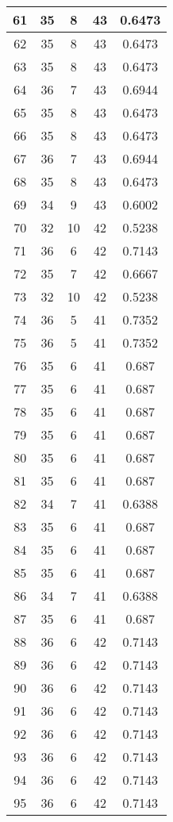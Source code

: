 \documentclass[letterpaper, 12pt]{article}
\begin{document}
\begin{longtable}{|c|c|c|c|c|}
\hline
61 & 35 & 8 & 43 & 0.6473 \\
\hline
62 & 35 & 8 & 43 & 0.6473 \\
\hline
63 & 35 & 8 & 43 & 0.6473 \\
\hline
64 & 36 & 7 & 43 & 0.6944 \\
\hline
65 & 35 & 8 & 43 & 0.6473 \\
\hline
66 & 35 & 8 & 43 & 0.6473 \\
\hline
67 & 36 & 7 & 43 & 0.6944 \\
\hline
68 & 35 & 8 & 43 & 0.6473 \\
\hline
69 & 34 & 9 & 43 & 0.6002 \\
\hline
70 & 32 & 10 & 42 & 0.5238 \\
\hline
71 & 36 & 6 & 42 & 0.7143 \\
\hline
72 & 35 & 7 & 42 & 0.6667 \\
\hline
73 & 32 & 10 & 42 & 0.5238 \\
\hline
74 & 36 & 5 & 41 & 0.7352 \\
\hline
75 & 36 & 5 & 41 & 0.7352 \\
\hline
76 & 35 & 6 & 41 & 0.687 \\
\hline
77 & 35 & 6 & 41 & 0.687 \\
\hline
78 & 35 & 6 & 41 & 0.687 \\
\hline
79 & 35 & 6 & 41 & 0.687 \\
\hline
80 & 35 & 6 & 41 & 0.687 \\
\hline
81 & 35 & 6 & 41 & 0.687 \\
\hline
82 & 34 & 7 & 41 & 0.6388 \\
\hline
83 & 35 & 6 & 41 & 0.687 \\
\hline
84 & 35 & 6 & 41 & 0.687 \\
\hline
85 & 35 & 6 & 41 & 0.687 \\
\hline
86 & 34 & 7 & 41 & 0.6388 \\
\hline
87 & 35 & 6 & 41 & 0.687 \\
\hline
88 & 36 & 6 & 42 & 0.7143 \\
\hline
89 & 36 & 6 & 42 & 0.7143 \\
\hline
90 & 36 & 6 & 42 & 0.7143 \\
\hline
91 & 36 & 6 & 42 & 0.7143 \\
\hline
92 & 36 & 6 & 42 & 0.7143 \\
\hline
93 & 36 & 6 & 42 & 0.7143 \\
\hline
94 & 36 & 6 & 42 & 0.7143 \\
\hline
95 & 36 & 6 & 42 & 0.7143 \\

\end{longtable}
\end{document}
